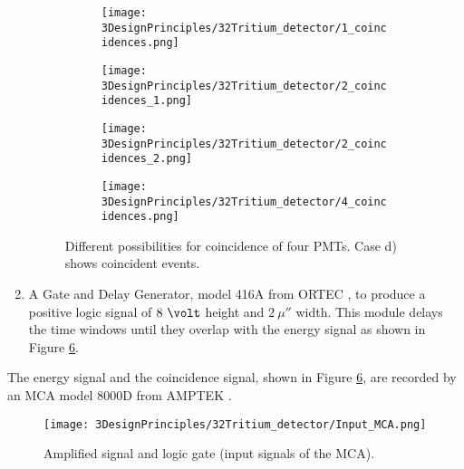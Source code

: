 \begin{enumerate}
\begin{figure}
\centering
    \begin{subfigure}[b]{0.45\textwidth}
    \centering
    \texttt{[image: 3DesignPrinciples/32Tritium\_detector/1\_coincidences.png]}  
    \caption{\label{subfig:signalInOnePMT}}
    \end{subfigure}
    \hfill
    \begin{subfigure}[b]{0.45\textwidth}
    \centering
    \texttt{[image: 3DesignPrinciples/32Tritium\_detector/2\_coincidences\_1.png]}  
    \caption{\label{subfig:signalInTwoPMTOneDetector}}
    \end{subfigure}
    \hfill
    \begin{subfigure}[b]{0.45\textwidth}
    \centering
    \texttt{[image: 3DesignPrinciples/32Tritium\_detector/2\_coincidences\_2.png]}  
    \caption{\label{subfig:signalInTwoPMTOtherDetector}}
    \end{subfigure}
    \hfill
    \begin{subfigure}[b]{0.45\textwidth}
    \centering
    \texttt{[image: 3DesignPrinciples/32Tritium\_detector/4\_coincidences.png]}  
    \caption{\label{subfig:signalInAllPMTsBothDetector}}
    \end{subfigure}
 \caption{Different possibilities for coincidence of four PMTs. Case d) shows coincident events.}
 \label{fig:DifferentCoincidences}
\end{figure}

\item{} A Gate and Delay Generator, model 416A from ORTEC \cite{DataSheetGateAndDelay}, to produce a positive logic signal of $8~\volt$ height and $2~\mu\second$ width. This module delays the time windows until they overlap with the energy signal as shown in Figure \ref{fig:InputSignalsMCA}.

\end{enumerate}

The energy signal and the coincidence signal, shown in Figure \ref{fig:InputSignalsMCA}, are recorded by an MCA model 8000D from AMPTEK \cite{DataSheetMCA}.

\begin{figure}[htbp]
\centering
\texttt{[image: 3DesignPrinciples/32Tritium\_detector/Input\_MCA.png]}
\caption{Amplified signal and logic gate (input signals of the MCA).\label{fig:InputSignalsMCA}}
\end{figure}